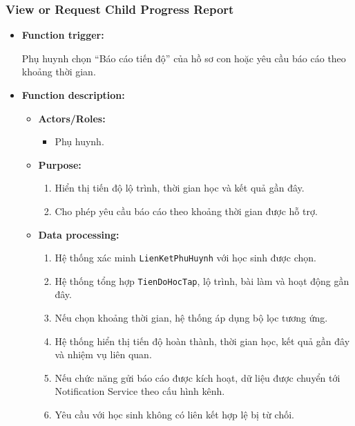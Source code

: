 \documentclass[12pt,a4paper,oneside]{report}
\begin{document}
\subsubsection{View or Request Child Progress Report}
\label{subsubsec:parent-view-request-progress}

\begin{itemize}

    \item \textbf{Function trigger:}

    Phụ huynh chọn ``Báo cáo tiến độ'' của hồ sơ con hoặc yêu cầu báo cáo theo khoảng thời gian.

    \item \textbf{Function description:}

    \begin{itemize}

        \item \textbf{Actors/Roles:}
        \begin{itemize}
            \item Phụ huynh.
        \end{itemize}

        \item \textbf{Purpose:}
        \begin{enumerate}
            \item Hiển thị tiến độ lộ trình, thời gian học và kết quả gần đây.
            \item Cho phép yêu cầu báo cáo theo khoảng thời gian được hỗ trợ.
        \end{enumerate}

        \item \textbf{Data processing:}
        \begin{enumerate}
            \item Hệ thống xác minh \texttt{LienKetPhuHuynh} với học sinh được chọn.
            \item Hệ thống tổng hợp \texttt{TienDoHocTap}, lộ trình, bài làm và hoạt động gần đây.
            \item Nếu chọn khoảng thời gian, hệ thống áp dụng bộ lọc tương ứng.
            \item Hệ thống hiển thị tiến độ hoàn thành, thời gian học, kết quả gần đây và nhiệm vụ liên quan.
            \item Nếu chức năng gửi báo cáo được kích hoạt, dữ liệu được chuyển tới Notification Service theo cấu hình kênh.
            \item Yêu cầu với học sinh không có liên kết hợp lệ bị từ chối.
        \end{enumerate}


\end{itemize}
\end{itemize}
\end{document}
